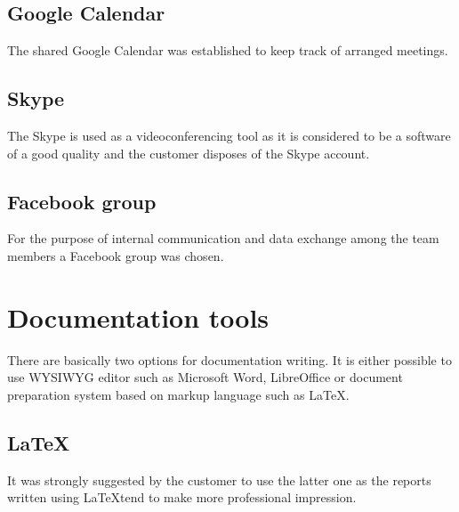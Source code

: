 
\subsection{Google Calendar}
The shared Google Calendar was established to keep track of arranged meetings.


\subsection{Skype}
The Skype is used as a videoconferencing tool as it is considered to be a software of a good quality and the customer disposes of the Skype account.


\subsection{Facebook group}
For the purpose of internal communication and data exchange among the team members a Facebook group was chosen.


\section{Documentation tools} 
\label{sec:documentation_tools}

There are basically two options for documentation writing. It is either possible to use WYSIWYG editor such as Microsoft Word, LibreOffice or document preparation system based on markup language such as \LaTeX.

\subsection{\LaTeX}

It was strongly suggested by the customer to use the latter one as the reports written using \LaTeX  tend to make more professional impression.


